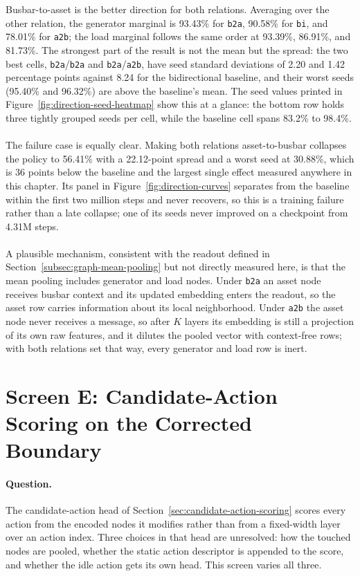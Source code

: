 Busbar-to-asset is the better direction for both relations. Averaging over the
other relation, the generator marginal is 93.43\% for \texttt{b2a}, 90.58\% for
\texttt{bi}, and 78.01\% for \texttt{a2b}; the load marginal follows the same
order at 93.39\%, 86.91\%, and 81.73\%. The strongest part of the result is not
the mean but the spread: the two best cells, \texttt{b2a}/\texttt{b2a} and
\texttt{b2a}/\texttt{a2b}, have seed standard deviations of 2.20 and 1.42
percentage points against 8.24 for the bidirectional baseline, and their worst
seeds (95.40\% and 96.32\%) are above the baseline's mean. The seed values
printed in Figure~\ref{fig:direction-seed-heatmap} show this at a glance: the
bottom row holds three tightly grouped seeds per cell, while the baseline cell
spans 83.2\% to 98.4\%.
\\
\\
The failure case is equally clear. Making both relations asset-to-busbar
collapses the policy to 56.41\% with a 22.12-point spread and a worst seed at
30.88\%, which is 36 points below the baseline and the largest single effect
measured anywhere in this chapter. Its panel in
Figure~\ref{fig:direction-curves} separates from the baseline within the first
two million steps and never recovers, so this is a training failure rather than
a late collapse; one of its seeds never improved on a checkpoint from 4.31M
steps.
\\
\\
A plausible mechanism, consistent with the readout defined in
Section~\ref{subsec:graph-mean-pooling} but not directly measured here, is that
the mean pooling includes generator and load nodes. Under \texttt{b2a} an asset
node receives busbar context and its updated embedding enters the readout, so
the asset row carries information about its local neighborhood. Under
\texttt{a2b} the asset node never receives a message, so after $K$ layers its
embedding is still a projection of its own raw features, and it dilutes the
pooled vector with context-free rows; with both relations set that way, every
generator and load row is inert.


\section{Screen E: Candidate-Action Scoring on the Corrected Boundary}
\label{sec:screen-e-cas}

\paragraph{Question.}
The candidate-action head of Section~\ref{sec:candidate-action-scoring} scores
every action from the encoded nodes it modifies rather than from a fixed-width
layer over an action index. Three choices in that head are unresolved: how the
touched nodes are pooled, whether the static action descriptor is appended to
the score, and whether the idle action gets its own head. This screen varies all
three.

